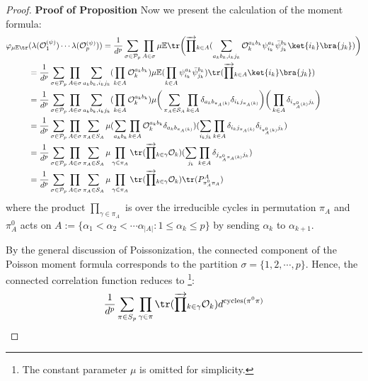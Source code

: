 \documentclass[a4paper,11pt]{article}
\theoremstyle{definition}
\numberwithin{equation}{section}
\begin{document}
\begin{proof}\textbf{Proof of Proposition}
    Now we present the calculation of the moment formula:
    \begin{align}
        \begin{split}
            \varphi_{\mu\mathbb{E}\tr}&(\lambda(\mathcal{O}^{(\psi)}_1)\cdots\lambda(\mathcal{O}^{(\psi)}_p)) = \frac{1}{d^p}\sum_{\sigma\in\mathcal{P}_p}\prod_{A\in\sigma}\mu\mathbb{E}\tr\bigg(\overrightarrow{\prod}_{k\in A}(\sum_{a_kb_k,i_kj_k}\mathcal{O}_k^{a_kb_k}\psi^{a_k}_{i_k}\bar{\psi}^{b_k}_{j_k}\ket{i_k}\bra{j_k})\bigg)
            \\& = \frac{1}{d^p}\sum_{\sigma\in\mathcal{P}_p}\prod_{A\in\sigma}\sum_{a_kb_k, i_kj_k}(\prod_{k\in A}\mathcal{O}_k^{a_kb_k})\mu\mathbb{E}(\prod_{k\in A}\psi^{a_k}_{i_k}\bar{\psi}^{b_k}_{j_k})\tr(\overrightarrow{\prod}_{k\in A}\ket{i_k}\bra{j_k})
            \\
            &=\frac{1}{d^p}\sum_{\sigma\in\mathcal{P}_p}\prod_{A\in\sigma}\sum_{a_kb_k,i_kj_k}(\prod_{k\in A} \mathcal{O}_k^{a_kb_k})\mu\bigg(\sum_{\pi_A\in \mathcal{S}_{A}}\prod_{k\in A}\delta_{a_kb_{\pi_A(k)}}\delta_{i_kj_{\pi_A(k)}}\bigg)\bigg(\prod_{k\in A}\delta_{i_{\pi_A^0(k)}j_k}\bigg)
            \\&
            =\frac{1}{d^p}\sum_{\sigma\in\mathcal{P}_p}\prod_{A\in\sigma}\sum_{\pi_A\in S_{A}}\mu(\sum_{a_kb_k}\prod_{k\in A}\mathcal{O}_k^{a_kb_k}\delta_{a_kb_{\pi_A(k)}})(\sum_{i_kj_k}\prod_{k\in A}\delta_{i_kj_{\pi_A(k)}}\delta_{i_{\pi_A^0(k)}j_{k}})
            \\&
            =\frac{1}{d^p}\sum_{\sigma\in\mathcal{P}_p}\prod_{A\in\sigma}\sum_{\pi_A\in\mathcal{S}_{A}}\mu\prod_{\gamma\in\pi_A}\tr(\overrightarrow{\prod}_{k\in\gamma}\mathcal{O}_k)(\sum_{j_k}\prod_{k\in A}\delta_{j_{\pi_A^0\pi_A(k)}j_{k}})
            \\
            &=\frac{1}{d^p}\sum_{\sigma\in\mathcal{P}_p}\prod_{A\in\sigma}\sum_{\pi_A\in\mathcal{S}_{A}}\mu\prod_{\gamma\in\pi_A}\tr(\overrightarrow{\prod}_{k\in\gamma}\mathcal{O}_k)\tr(P^A_{\pi_A^0\pi_A})
        \end{split}
    \end{align}
    where the product $\prod_{\gamma\in\pi_A}$ is over the irreducible cycles in permutation $\pi_A$ and $\pi_A^0$ acts on $A := \{\alpha_1 < \alpha_2 < \cdots\alpha_{|A|}:1\leq \alpha_k\leq p\}$ by sending $\alpha_k$ to $\alpha_{k+1}$.

    By the general discussion of Poissonization, the connected component of the Poisson moment formula corresponds to the partition $\sigma = \{1,2,\cdots,p\}$. Hence, the connected correlation function reduces to \footnote{The constant parameter $\mu$ is omitted for simplicity.}:
    \begin{equation}
        \frac{1}{d^p}\sum_{\pi\in S_p}\prod_{\gamma\in\pi}\tr(\overrightarrow{\prod}_{k\in\gamma}\mathcal{O}_k)d^{\text{cycles}(\pi^0\pi)}\qedhere
    \end{equation}
\end{proof}
\end{document}
